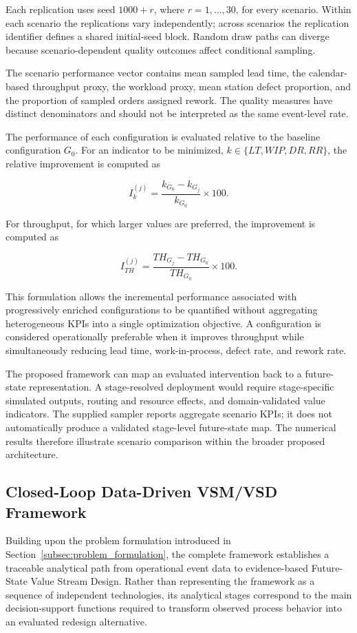 \documentclass[pdflatex,iicol,Numbered,sn-basic]{sn-jnl}
\begin{document}
Each replication uses seed \(1000+r\), where \(r=1,\ldots,30\), for every scenario. Within each scenario the replications vary independently; across scenarios the replication identifier defines a shared initial-seed block. Random draw paths can diverge because scenario-dependent quality outcomes affect conditional sampling.

The scenario performance vector contains mean sampled lead time, the calendar-based throughput proxy, the workload proxy, mean station defect proportion, and the proportion of sampled orders assigned rework. The quality measures have distinct denominators and should not be interpreted as the same event-level rate.

The performance of each configuration is evaluated relative to the baseline
configuration \(G_0\). For an indicator to be minimized,
\(k\in\{LT,WIP,DR,RR\}\), the relative improvement is computed as

\[
I_k^{(j)}
=
\frac{
k_{G_0}-k_{G_j}
}{
k_{G_0}
}
\times 100.
\]

For throughput, for which larger values are preferred, the improvement is
computed as

\[
I_{TH}^{(j)}
=
\frac{
TH_{G_j}-TH_{G_0}
}{
TH_{G_0}
}
\times 100.
\]

This formulation allows the incremental performance associated with
progressively enriched configurations to be quantified without aggregating
heterogeneous KPIs into a single optimization objective.
A configuration is considered operationally preferable when it improves
throughput while simultaneously reducing lead time, work-in-process, defect
rate, and rework rate.

The proposed framework can map an evaluated intervention back to a future-state representation. A stage-resolved deployment would require stage-specific simulated outputs, routing and resource effects, and domain-validated value indicators. The supplied sampler reports aggregate scenario KPIs; it does not automatically produce a validated stage-level future-state map. The numerical results therefore illustrate scenario comparison within the broader proposed architecture.

\subsection{Closed-Loop Data-Driven VSM/VSD Framework}
\label{subsec:closed_loop_framework}

Building upon the problem formulation introduced in
Section~\ref{subsec:problem_formulation}, the complete framework establishes
a traceable analytical path from operational event data to evidence-based
Future-State Value Stream Design. Rather than representing the framework as
a sequence of independent technologies, its analytical stages correspond to
the main decision-support functions required to transform observed process
behavior into an evaluated redesign alternative.
\end{document}
